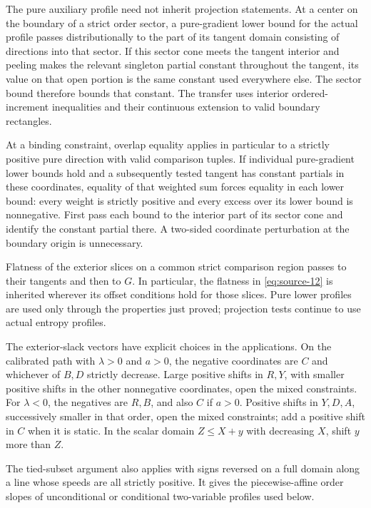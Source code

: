 The pure auxiliary profile need not inherit projection statements.
At a center on the boundary of a strict order sector, a
pure-gradient lower bound for the actual profile passes
distributionally to the part of its tangent domain consisting of
directions into that sector.  If this sector cone meets the tangent
interior and peeling makes the relevant singleton partial constant
throughout the tangent, its value on that open portion is the same
constant used everywhere else.  The sector bound therefore bounds
that constant.  The transfer uses
interior ordered-increment inequalities and their continuous
extension to valid boundary rectangles.

\begin{remark}
\label{ent:signed-envelope-boundary}
At a binding constraint, overlap equality applies in particular
to a strictly positive pure direction with valid comparison
tuples.  If individual pure-gradient lower bounds hold and a
subsequently tested tangent has constant partials in these
coordinates, equality of that weighted sum forces equality in
each lower bound: every weight is strictly positive and every
excess over its lower bound is nonnegative.  First pass each
bound to the interior part of its sector cone and identify the
constant partial there.  A two-sided coordinate perturbation
at the boundary origin is unnecessary.

Flatness of the exterior slices on a common strict comparison
region passes to their tangents and then to $G$.  In particular,
the flatness in \eqref{eq:source-12} is inherited wherever its
offset conditions hold for those slices.  Pure lower profiles
are used only through the properties just proved; projection
tests continue to use actual entropy profiles.

The exterior-slack vectors have explicit choices in the
applications.  On the calibrated path with $\lambda>0$ and
$a>0$, the negative coordinates are $C$ and whichever of
$B,D$ strictly decrease.  Large positive shifts in $R,Y$,
with smaller positive shifts in the other nonnegative
coordinates, open the mixed constraints.  For $\lambda<0$,
the negatives are $R,B$, and also $C$ if $a>0$.  Positive
shifts in $Y,D,A$, successively smaller in that order, open
the mixed constraints; add a positive shift in $C$ when it
is static.  In the scalar domain $Z\leq X+y$ with decreasing
$X$, shift $y$ more than $Z$.

The tied-subset argument also applies with signs reversed on
a full domain along a line whose speeds are all strictly
positive.  It gives the piecewise-affine order slopes of
unconditional or conditional two-variable profiles used below.
\end{remark}

